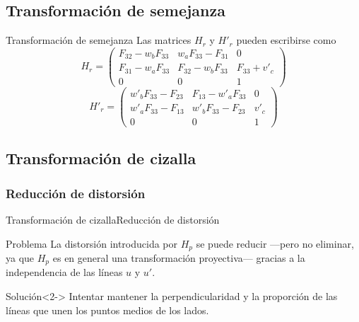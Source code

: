 \documentclass[14pt,spanish]{beamer}
\begin{document}
      \subsection{Transformación de semejanza}

        \begin{frame}{Transformación de semejanza}
            Las matrices $H_r$ y $H'_r$ pueden escribirse como
            \[
            H_r = \begin{pmatrix}
                F_{32} - w_b F_{33} & w_a F_{33} - F_{31} & 0 \\
                F_{31} - w_a F_{33} & F_{32} - w_b F_{33} & F_{33} + v'_c \\
                0 & 0 & 1
            \end{pmatrix}
            \]
            \[
            H'_r = \begin{pmatrix}
                w'_b F_{33} - F_{23} & F_{13} - w'_a F_{33} & 0 \\
                w'_a F_{33} - F_{13} & w'_b F_{33} - F_{23} & v'_c \\
                0 & 0 & 1
            \end{pmatrix}
            \]

             
        \end{frame}

      \subsection{Transformación de cizalla}

        \subsubsection{Reducción de distorsión}
          \begin{frame}{Transformación de cizalla}{Reducción de distorsión}
              \begin{alertblock}{Problema}
                  La distorsión introducida por $H_p$ se puede reducir ---pero no eliminar, ya que $H_p$ es en general una transformación proyectiva--- gracias a la independencia de las líneas $u$ y $u'$.
              \end{alertblock}

              \begin{alertblock}{Solución}<2->
                  Intentar mantener la perpendicularidad y la proporción de las líneas que unen los puntos medios de los lados.
              \end{alertblock}
          \end{frame}
\end{document}
